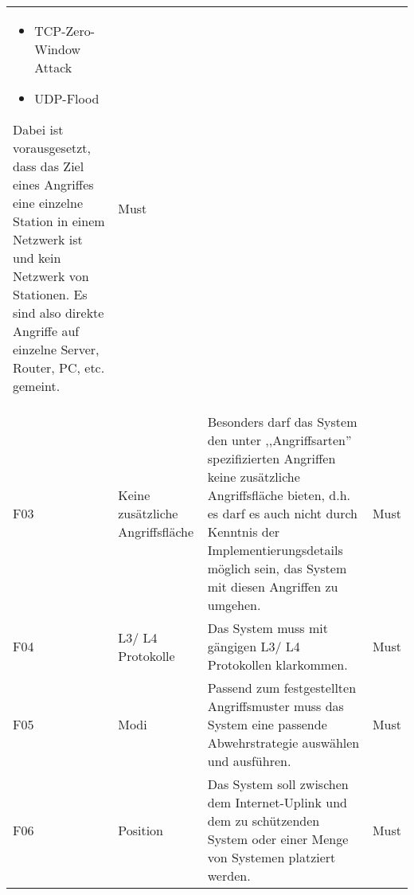 \documentclass[../review_3.tex]{subfiles}
\begin{document}
\begin{longtable} [h] {p{1cm} p{4cm} p{7cm} l}
\begin{itemize}
        \item TCP-Zero-Window Attack
        \item UDP-Flood
    \end{itemize}
    Dabei ist vorausgesetzt, dass das Ziel eines Angriffes eine einzelne Station in einem Netzwerk ist und kein Netzwerk von Stationen. Es sind also direkte Angriffe auf einzelne Server, Router, PC, etc. gemeint. & Must                                                                                                                                                                                                                                                                                                                       \\
    F03                                                                                                                                                                                                              & Keine zusätzliche Angriffsfläche               & Besonders darf das System den unter ,,Angriffsarten'' spezifizierten Angriffen keine zusätzliche Angriffsfläche bieten, d.h. es darf es auch nicht durch Kenntnis der Implementierungsdetails möglich sein, das System mit diesen Angriffen zu umgehen. & Must            \\
    F04                                                                                                                                                                                                              & L3/ L4 Protokolle                              & Das System muss mit gängigen L3/ L4 Protokollen klarkommen.                                                                                                                                                                                             & Must            \\
    F05                                                                                                                                                                                                              & Modi                                           & Passend zum festgestellten Angriffsmuster muss das System eine passende Abwehrstrategie auswählen und ausführen.                                                                                                                                        & Must            \\
    F06                                                                                                                                                                                                              & Position                                       & Das System soll zwischen dem Internet-Uplink und dem zu schützenden System oder einer Menge von Systemen platziert werden.                                                                                                                              & Must            \\

\end{longtable}
\end{document}
